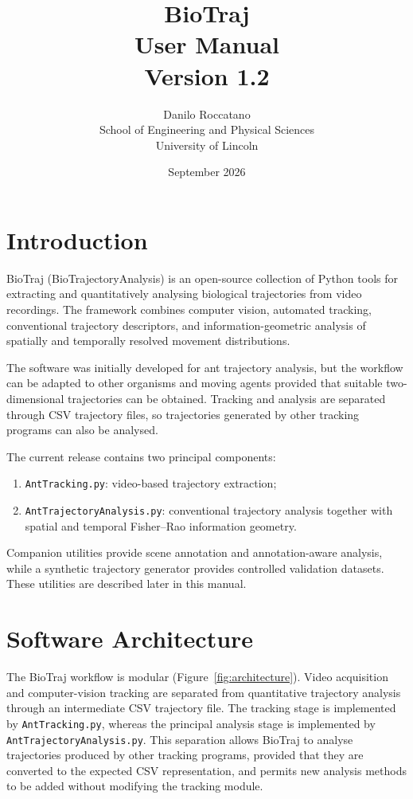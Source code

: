 \documentclass[11pt,a4paper]{article}
\title{BioTraj\\User Manual\\Version 1.2}
\author{Danilo Roccatano\\School of Engineering and Physical Sciences\\University of Lincoln}
\date{September 2026}
\begin{document}
\maketitle
\tableofcontents
\newpage

\section{Introduction}
BioTraj (BioTrajectoryAnalysis) is an open-source collection of Python tools for extracting and quantitatively analysing biological trajectories from video recordings. The framework combines computer vision, automated tracking, conventional trajectory descriptors, and information-geometric analysis of spatially and temporally resolved movement distributions.

The software was initially developed for ant trajectory analysis, but the workflow can be adapted to other organisms and moving agents provided that suitable two-dimensional trajectories can be obtained. Tracking and analysis are separated through CSV trajectory files, so trajectories generated by other tracking programs can also be analysed.

The current release contains two principal components:
\begin{enumerate}
\item \texttt{AntTracking.py}: video-based trajectory extraction;
\item \texttt{AntTrajectoryAnalysis.py}: conventional trajectory analysis together with spatial and temporal Fisher--Rao information geometry.
\end{enumerate}
Companion utilities provide scene annotation and annotation-aware analysis, while a synthetic trajectory generator provides controlled validation datasets. These utilities are described later in this manual.

\section{Software Architecture}
The BioTraj workflow is modular (Figure~\ref{fig:architecture}). Video acquisition and computer-vision tracking are separated from quantitative trajectory analysis through an intermediate CSV trajectory file. The tracking stage is implemented by \texttt{AntTracking.py}, whereas the principal analysis stage is implemented by \texttt{AntTrajectoryAnalysis.py}. This separation allows BioTraj to analyse trajectories produced by other tracking programs, provided that they are converted to the expected CSV representation, and permits new analysis methods to be added without modifying the tracking module.
\end{document}
